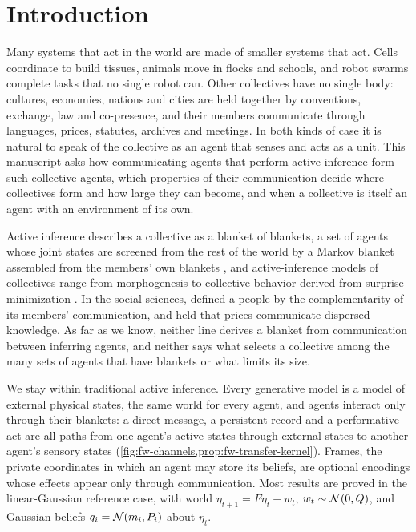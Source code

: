 \section{Introduction}\label{sec:int}

Many systems that act in the world are made of smaller systems that act. Cells coordinate to build tissues, animals move in flocks and schools, and robot swarms complete tasks that no single robot can. Other collectives have no single body: cultures, economies, nations and cities are held together by conventions, exchange, law and co-presence, and their members communicate through languages, prices, statutes, archives and meetings. In both kinds of case it is natural to speak of the collective as an agent that senses and acts as a unit. This manuscript asks how communicating agents that perform active inference \citep{friston2017active,parr2022active} form such collective agents, which properties of their communication decide where collectives form and how large they can become, and when a collective is itself an agent with an environment of its own.

Active inference describes a collective as a blanket of blankets, a set of agents whose joint states are screened from the rest of the world by a Markov blanket assembled from the members' own blankets \citep{kirchhoff2018markov,ramstead2018answering,palacios2020markov}, and active-inference models of collectives range from morphogenesis \citep{kuchling2020morphogenesis} to collective behavior derived from surprise minimization \citep{heins2024collective}. In the social sciences, \citet{deutsch1953nationalism} defined a people by the complementarity of its members' communication, and \citet{hayek1945use} held that prices communicate dispersed knowledge. As far as we know, neither line derives a blanket from communication between inferring agents, and neither says what selects a collective among the many sets of agents that have blankets or what limits its size.

We stay within traditional active inference. Every generative model is a model of external physical states, the same world for every agent, and agents interact only through their blankets: a direct message, a persistent record and a performative act are all paths from one agent's active states through external states to another agent's sensory states (\cref{fig:fw-channels,prop:fw-transfer-kernel}). Frames, the private coordinates in which an agent may store its beliefs, are optional encodings whose effects appear only through communication. Most results are proved in the linear-Gaussian reference case, with world $\eta_{t+1}=F\eta_t+w_t$, $w_t\sim\mathcal{N}(0,Q)$, and Gaussian beliefs $q_i=\mathcal{N}(m_i,P_i)$ about $\eta_t$.

